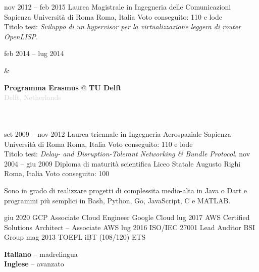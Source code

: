 \documentclass[9pt]{developercv}
\begin{document}

\begin{entrylist}
	\entry
		{nov 2012 -- feb 2015}
		{Laurea Magistrale in Ingegneria delle Comunicazioni}
		{Sapienza Università di Roma}
		{Roma, Italia}
		{
			Voto conseguito: 110 e lode
			\\
			Titolo tesi: \textit{Sviluppo di un hypervisor per la virtualizzazione leggera di router OpenLISP}.
		}
		\parbox[t]{0.2\textwidth}{
			feb 2014 -- lug 2014
		}
		&\parbox[t]{0.8\textwidth}{
			\textbf{Programma Erasmus} @ \textbf{TU Delft}
			\\
			\textcolor{lightgrey}{Delft, Netherlands}
		}\\\\
	\entry
		{set 2009 -- nov 2012}
		{Laurea triennale in Ingegneria Aerospaziale}
		{Sapienza Università di Roma}
		{Roma, Italia}
		{
			Voto conseguito: 110 e lode
			\\
			Titolo tesi: \textit{Delay- and Disruption-Tolerant Networking \& Bundle Protocol}.
		}
	\entry
		{nov 2004 -- giu 2009}
		{Diploma di maturità scientifica}
		{Liceo Statale Augusto Righi}
		{Roma, Italia}
		{Voto conseguito: 100}
\end{entrylist}


\begin{minipage}[t]{1\textwidth}
	\vspace{-\baselineskip}
	Sono in grado di realizzare progetti di complessita medio-alta in Java o Dart e programmi più semplici in Bash, Python, Go, JavaScript, C e MATLAB.
\end{minipage}


\begin{entrylist}
	\entryCert
		{giu 2020}
		{GCP Associate Cloud Engineer}
		{Google Cloud}
	\entryCert
		{lug 2017}
		{AWS Certified Solutions Architect -- Associate}
		{AWS}
	\entryCert
		{lug 2016}
		{ISO/IEC 27001 Lead Auditor}
		{BSI Group}
	\entryCert
		{mag 2013}
		{TOEFL iBT (108/120)}
		{ETS}
\end{entrylist}

\begin{minipage}[t]{1\textwidth}
	\vspace{-\baselineskip}

	
	\textbf{Italiano} -- madrelingua\\
	\textbf{Inglese} -- avanzato
\end{minipage}
\end{document}
